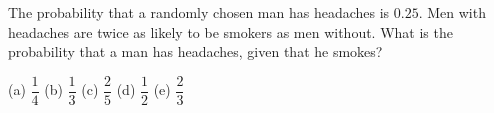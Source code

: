 The probability that a randomly chosen man has headaches is $0.25$. Men with headaches are twice as likely to be smokers as men without. What is the probability that a man has headaches, given that he smokes?

(a) $\dfrac{1}{4}$ \quad (b) $\dfrac{1}{3}$ \quad (c) $\dfrac{2}{5}$ \quad (d) $\dfrac{1}{2}$ \quad (e) $\dfrac{2}{3}$
